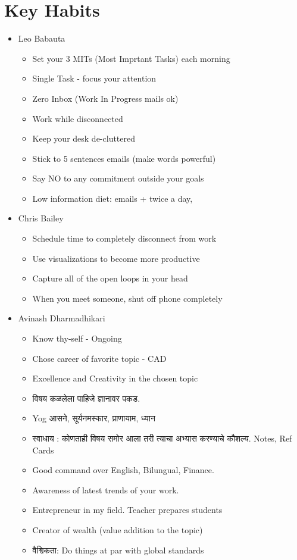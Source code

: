 \section{Key Habits}
\begin{itemize}[noitemsep,nolistsep]
\item Leo Babauta
	\begin{itemize}[noitemsep,nolistsep]
	\item Set your 3 MITs (Most Imprtant Tasks) each morning
	\item Single Task - focus your attention
	\item Zero Inbox (Work In Progress mails ok)
	\item Work while disconnected
	\item Keep your desk de-cluttered
	\item Stick to 5 sentences emails (make words powerful)
	\item Say NO to any commitment outside your goals
	\item Low information diet: emails + twice a day, 
	\end{itemize}

\item Chris Bailey
	\begin{itemize}[noitemsep,nolistsep]
	\item Schedule time to completely disconnect from work
	\item Use visualizations to become more productive
	\item Capture all of the open loops in your head
	\item When you meet someone, shut off phone completely
	\end{itemize}

\item Avinash Dharmadhikari
	\begin{itemize}[noitemsep,nolistsep]
	\item Know thy-self - Ongoing
	\item Chose career of favorite topic - CAD
	\item Excellence and Creativity in the chosen topic
	\item \foreignlanguage{sanskrit}{विषय कळलेला पाहिजे ज्ञानावर पकड}. 
	\item Yog \foreignlanguage{sanskrit}{आसने, सूर्यनमस्कार, प्राणायाम, ध्यान}
	\item \foreignlanguage{sanskrit}{स्वाधाय : कोणताही विषय समोर आला तरी त्याचा अभ्यास करण्याचे कौशल्य}. Notes, Ref Cards
	\item Good command over English, Bilungual, Finance.
	\item Awareness of latest trends of your work.
	\item Entrepreneur in my field.  Teacher prepares students
	\item Creator of wealth (value addition to the topic)  
	\item \foreignlanguage{sanskrit}{वैश्विकता}: Do things at par with global standards
	\end{itemize}


\end{itemize}
